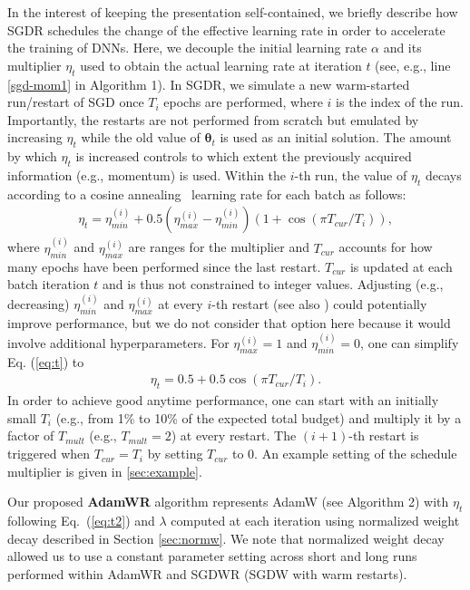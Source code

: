 \documentclass[usenames,dvipsnames]{article}
\begin{document}
In the interest of keeping the presentation self-contained, we briefly describe how SGDR schedules the change of the effective learning rate in order to accelerate the training of DNNs. Here, we decouple the initial learning rate $\alpha$ and its multiplier $\eta_t$ used to obtain the actual learning rate at iteration $t$ (see, e.g., line \ref{sgd-mom1} in Algorithm 1). 
In SGDR, we simulate a new warm-started run/restart of SGD once $T_i$ epochs are performed, where $i$ is the index of the run. Importantly, the restarts are not performed from scratch but emulated by increasing $\eta_t$ while the old value of $\bm{\theta}_{t}$ is used as an initial solution. The amount by which $\eta_t$ is increased controls to which extent the previously acquired information (e.g., momentum) is used. Within the $i$-th run, the value of $\eta_t$ decays according to a cosine annealing~\citep{loshchilov2016sgdr} 
learning rate for each batch as follows:
\begin{eqnarray}
	\label{eq:t}
	\eta_t = \eta^{(i)}_{min} + 0.5 (\eta^{(i)}_{max} - \eta^{(i)}_{min}) (1 + \cos(\pi T_{cur} / {T_i})),	
\end{eqnarray}
where $\eta^{(i)}_{min}$ and $\eta^{(i)}_{max}$ are ranges for the multiplier and $T_{cur}$ accounts for how many epochs have been performed since the last restart.  $T_{cur}$ is updated at each batch iteration $t$ and is thus not constrained to integer values.
Adjusting (e.g., decreasing) $\eta^{(i)}_{min}$ and $\eta^{(i)}_{max}$ at every $i$-th restart (see also \cite{smith2016}) could potentially improve performance, but we do not consider that option here because it would involve additional hyperparameters. 
For $\eta^{(i)}_{max}=1$ and $\eta^{(i)}_{min}=0$, one can simplify Eq. (\ref{eq:t}) to
\begin{eqnarray}
	\label{eq:t2}
	\eta_t = 0.5 + 0.5\cos(\pi T_{cur} / {T_i}).	
\end{eqnarray}
In order to achieve good anytime performance, one can start with an initially small $T_i$ (e.g., from 1\% to 10\% of the expected total budget) and multiply it by a factor of $T_{mult}$ (e.g., $T_{mult}=2$) at every restart. The $(i+1)$-th restart is triggered when $T_{cur} = T_i$ by setting $T_{cur}$ to 0. An example setting of the schedule multiplier is given in  \ref{sec:example}. 

Our proposed \textbf{AdamWR} algorithm represents AdamW (see Algorithm 2) with $\eta_t$ following Eq.\ (\ref{eq:t2}) and $\lambda$ computed at each iteration using normalized weight decay described in Section \ref{sec:normw}. 
We note that normalized weight decay allowed us to use a constant parameter setting across short and long runs performed within AdamWR and SGDWR (SGDW with warm restarts).
\end{document}
